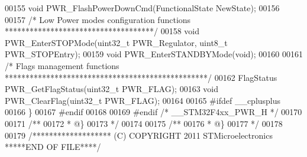 \begin{DoxyCode}
00155 \textcolor{keywordtype}{void} PWR_FlashPowerDownCmd(FunctionalState NewState);
00156 
00157 \textcolor{comment}{/* Low Power modes configuration functions ************************************/}
00158 \textcolor{keywordtype}{void} PWR_EnterSTOPMode(uint32\_t PWR\_Regulator, uint8\_t PWR\_STOPEntry);
00159 \textcolor{keywordtype}{void} PWR_EnterSTANDBYMode(\textcolor{keywordtype}{void});
00160 
00161 \textcolor{comment}{/* Flags management functions *************************************************/}
00162 FlagStatus PWR_GetFlagStatus(uint32\_t PWR\_FLAG);
00163 \textcolor{keywordtype}{void} PWR_ClearFlag(uint32\_t PWR\_FLAG);
00164 
00165 \textcolor{preprocessor}{#}\textcolor{preprocessor}{ifdef} \_\_cplusplus
00166 \}
00167 \textcolor{preprocessor}{#}\textcolor{preprocessor}{endif}
00168 
00169 \textcolor{preprocessor}{#}\textcolor{preprocessor}{endif} \textcolor{comment}{/* \_\_STM32F4xx\_PWR\_H */}
00170 
00171 \textcolor{comment}{/**}
00172 \textcolor{comment}{  * @\}}
00173 \textcolor{comment}{  */}
00174 
00175 \textcolor{comment}{/**}
00176 \textcolor{comment}{  * @\}}
00177 \textcolor{comment}{  */}
00178 
00179 \textcolor{comment}{/******************* (C) COPYRIGHT 2011 STMicroelectronics *****END OF FILE****/}
\end{DoxyCode}
